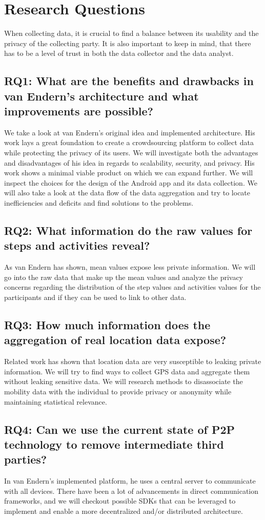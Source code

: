 \section{Research Questions}
When collecting data, it is crucial to find a balance between its usability and the privacy of the collecting party. It is also important to keep in mind, that there has to be a level of trust in both the data collector and the data analyst.
\subsection*{RQ1: What are the benefits and drawbacks in van Endern's architecture and what improvements are possible?}
We take a look at van Endern's \cite{simon} original idea and implemented architecture. His work lays a great foundation to create a crowdsourcing platform to collect data while protecting the privacy of its users. We will investigate both the advantages and disadvantages of his idea in regards to scalability, security, and privacy. His work shows a minimal viable product on which we can expand further. We will inspect the choices for the design of the Android app and its data collection. We will also take a look at the data flow of the data aggregation and try to locate inefficiencies and deficits and find solutions to the problems.
\subsection*{RQ2: What information do the raw values for steps and activities reveal?}
As van Endern has shown, mean values expose less private information. We will go into the raw data that make up the mean values and analyze the privacy concerns regarding the distribution of the step values and activities values for the participants and if they can be used to link to other data.
\subsection*{RQ3: How much information does the aggregation of real location data expose?}
Related work has shown that location data are very susceptible to leaking private information. We will try to find ways to collect GPS data and aggregate them without leaking sensitive data. We will research methods to disassociate the mobility data with the individual to provide privacy or anonymity while maintaining statistical relevance.
\subsection*{RQ4: Can we use the current state of P2P technology to remove intermediate third parties?}
In van Endern's implemented platform, he uses a central server to communicate with all devices. There have been a lot of advancements in direct communication frameworks, and we will checkout possible SDKs that can be leveraged to implement and enable a more decentralized and/or distributed architecture.

